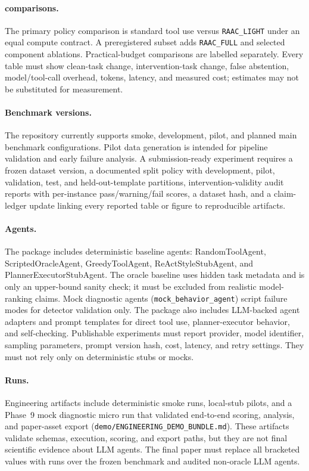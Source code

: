 \paragraph{\RAAC comparisons.}
The primary policy comparison is standard tool use versus
\texttt{RAAC\_LIGHT} under an equal compute contract. A preregistered subset
adds \texttt{RAAC\_FULL} and selected component ablations. Practical-budget
comparisons are labelled separately. Every table must show clean-task change,
intervention-task change, false abstention, model/tool-call overhead, tokens,
latency, and measured cost; estimates may not be substituted for measurement.

\paragraph{Benchmark versions.}
The repository currently supports smoke, development, pilot, and planned main benchmark configurations. Pilot data generation is intended for pipeline validation and early failure analysis. A submission-ready experiment requires a frozen dataset version, a documented split policy with development, pilot, validation, test, and held-out-template partitions, intervention-validity audit reports with per-instance pass/warning/fail scores, a dataset hash, and a claim-ledger update linking every reported table or figure to reproducible artifacts.

\paragraph{Agents.}
The package includes deterministic baseline agents: RandomToolAgent, ScriptedOracleAgent, GreedyToolAgent, ReActStyleStubAgent, and PlannerExecutorStubAgent. The oracle baseline uses hidden task metadata and is only an upper-bound sanity check; it must be excluded from realistic model-ranking claims. Mock diagnostic agents (\texttt{mock\_behavior\_agent}) script failure modes for detector validation only. The package also includes LLM-backed agent adapters and prompt templates for direct tool use, planner-executor behavior, and self-checking. Publishable experiments must report provider, model identifier, sampling parameters, prompt version hash, cost, latency, and retry settings. They must not rely only on deterministic stubs or mocks.

\paragraph{Runs.}
Engineering artifacts include deterministic smoke runs, local-stub pilots, and a Phase~9 mock diagnostic micro run that validated end-to-end scoring, analysis, and paper-asset export (\texttt{demo/ENGINEERING\_DEMO\_BUNDLE.md}). These artifacts validate schemas, execution, scoring, and export paths, but they are not final scientific evidence about LLM agents. The final paper must replace all bracketed values with runs over the frozen benchmark and audited non-oracle LLM agents.

